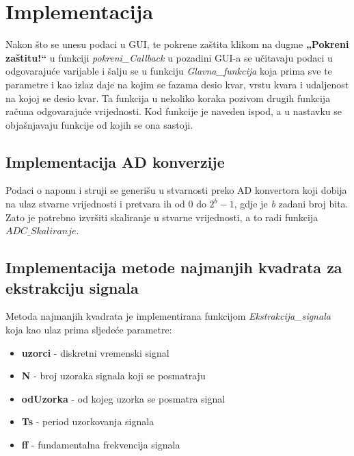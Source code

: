 \chapter{Implementacija}

Nakon što se unesu podaci u GUI, te pokrene zaštita klikom na dugme \textbf{ „Pokreni zaštitu!“} u funkciji \textit{pokreni\_Callback} u pozadini GUI-a se učitavaju podaci u odgovarajuće varijable i šalju se u funkciju \textit{Glavna\_funkcija} koja prima sve te parametre i kao izlaz daje na kojim se fazama desio kvar, vrstu kvara i udaljenost na kojoj se desio kvar. Ta funkcija u nekoliko koraka pozivom drugih funkcija računa odgovarajuće vrijednosti. Kod funkcije je naveden ispod, a u nastavku se objašnjavaju funkcije od kojih se ona sastoji.



\section{Implementacija AD konverzije}

Podaci o naponu i struji se generišu u stvarnosti preko AD konvertora koji dobija na ulaz stvarne vrijednosti i pretvara ih od 0 do $2^b-1$, gdje je \textit{b} zadani broj bita. Zato je potrebno izvršiti skaliranje u stvarne vrijednosti, a to radi funkcija \textit{$ADC\_Skaliranje$}.   




\section{Implementacija metode najmanjih kvadrata za ekstrakciju signala}



Metoda najmanjih kvadrata je implementirana funkcijom \textit{Ekstrakcija\_signala} koja kao ulaz prima sljedeće parametre:

\begin{itemize}
    \item \textbf{uzorci} - diskretni vremenski signal 
    \item \textbf{N} - broj uzoraka signala koji se posmatraju
    \item \textbf{odUzorka} - od kojeg uzorka se posmatra signal
    \item \textbf{Ts} - period uzorkovanja signala 
    \item \textbf{ff} - fundamentalna frekvencija signala
\end{itemize}

